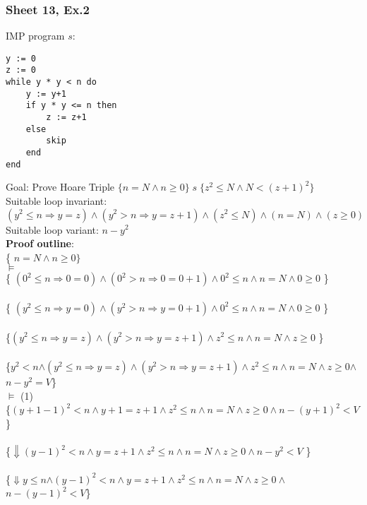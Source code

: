 \documentclass[11.5pt]{article}
\begin{document}
\subsubsection{Sheet 13, Ex.2}
IMP program $s$:
\begin{verbatim}
y := 0
z := 0
while y * y < n do
    y := y+1
    if y * y <= n then
        z := z+1
    else
        skip
    end
end
\end{verbatim}
Goal: Prove
Hoare Triple $\{n=N \land n \geq 0\} \; s \; \{ z^2 \leq N \land N < (z+1)^2\}$ \smallskip \\
Suitable loop invariant: 
$$(y^2 \leq n \Rightarrow y = z) \land (y^2 > n \Rightarrow y = z + 1) \land (z^2 \leq N) \land (n=N) \land (z \geq 0)$$ 
Suitable loop variant: $n-y^2$ \\
\textbf{Proof outline}: \\
\{ $n=N \land n \geq 0\}$ \\
$\vDash$ \\
\{ $(0^2 \leq n \Rightarrow 0 = 0) \land (0^2 > n \Rightarrow 0 = 0 + 1) \land 0^2 \leq n \land n=N \land 0 \geq 0$ \} \\
 \\
\{ $(y^2 \leq n \Rightarrow y = 0) \land (y^2 > n \Rightarrow y = 0 + 1) \land 0^2 \leq n \land n=N \land 0 \geq 0$ \} \\
 \\
\{\colorbox{blue!10}{$(y^2 \leq n \Rightarrow y = z) \land (y^2 > n \Rightarrow y = z + 1) \land z^2 \leq n \land n=N \land z \geq 0$} \} \\
 \\
\{\colorbox{magenta!10}{$y^2 < n$}$\land$\colorbox{blue!10}{$(y^2 \leq n \Rightarrow y = z) \land (y^2 > n \Rightarrow y = z + 1) \land z^2 \leq n \land n=N \land z \geq 0$}$\land$\colorbox{teal!10}{$n-y^2=V$}\} \\
$\vDash$ (1) \\
\{$(y+1-1)^2<n \land y+1 = z+1\land z^2 \leq n \land n=N \land z\geq 0\land$\colorbox{teal!10}{$n-(y+1)^2<V$}\} \\
 \\
\{$\Downarrow (y-1)^2<n \land y = z+1\land z^2 \leq n \land n=N \land z\geq 0\land$\colorbox{teal!10}{$n-y^2<V$} \} \\
 \\
\{$\Downarrow$\colorbox{NavyBlue!10}{$y \leq n$}$\land (y-1)^2<n \land y = z+1\land z^2 \leq n \land n=N \land z\geq 0\land$\colorbox{teal!10}{$n-(y-1)^2<V$}\}\\
\end{document}

